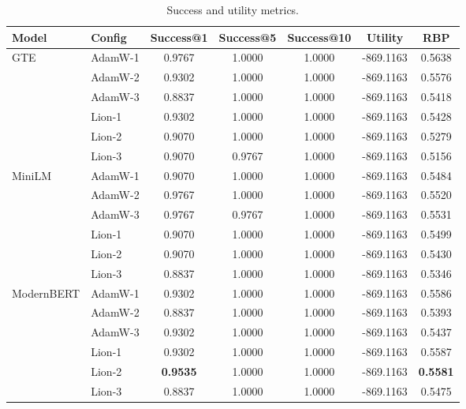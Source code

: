 \documentclass[conference]{IEEEtran}
\begin{document}
\begin{table}[t]
\centering
\caption{Success and utility metrics.}
\label{tab:success_metrics}
\small
\begin{tabular}{llccccc}
\toprule
\textbf{Model} & \textbf{Config} & \textbf{Success@1} & \textbf{Success@5} & \textbf{Success@10} & \textbf{Utility} & \textbf{RBP} \\
\midrule
\multirow{6}{*}{GTE} & AdamW-1 & 0.9767 & 1.0000 & 1.0000 & -869.1163 & 0.5638 \\
 & AdamW-2 & 0.9302 & 1.0000 & 1.0000 & -869.1163 & 0.5576 \\
 & AdamW-3 & 0.8837 & 1.0000 & 1.0000 & -869.1163 & 0.5418 \\
 & Lion-1 & 0.9302 & 1.0000 & 1.0000 & -869.1163 & 0.5428 \\
 & Lion-2 & 0.9070 & 1.0000 & 1.0000 & -869.1163 & 0.5279 \\
 & Lion-3 & 0.9070 & 0.9767 & 1.0000 & -869.1163 & 0.5156 \\
\midrule
\multirow{6}{*}{MiniLM} & AdamW-1 & 0.9070 & 1.0000 & 1.0000 & -869.1163 & 0.5484 \\
 & AdamW-2 & 0.9767 & 1.0000 & 1.0000 & -869.1163 & 0.5520 \\
 & AdamW-3 & 0.9767 & 0.9767 & 1.0000 & -869.1163 & 0.5531 \\
 & Lion-1 & 0.9070 & 1.0000 & 1.0000 & -869.1163 & 0.5499 \\
 & Lion-2 & 0.9070 & 1.0000 & 1.0000 & -869.1163 & 0.5430 \\
 & Lion-3 & 0.8837 & 1.0000 & 1.0000 & -869.1163 & 0.5346 \\
\midrule
\multirow{6}{*}{ModernBERT} & AdamW-1 & 0.9302 & 1.0000 & 1.0000 & -869.1163 & 0.5586 \\
 & AdamW-2 & 0.8837 & 1.0000 & 1.0000 & -869.1163 & 0.5393 \\
 & AdamW-3 & 0.9302 & 1.0000 & 1.0000 & -869.1163 & 0.5437 \\
 & Lion-1 & 0.9302 & 1.0000 & 1.0000 & -869.1163 & 0.5587 \\
 & Lion-2 & \textbf{0.9535} & 1.0000 & 1.0000 & -869.1163 & \textbf{0.5581} \\
 & Lion-3 & 0.8837 & 1.0000 & 1.0000 & -869.1163 & 0.5475 \\
\bottomrule
\end{tabular}
\end{table}
\end{document}
